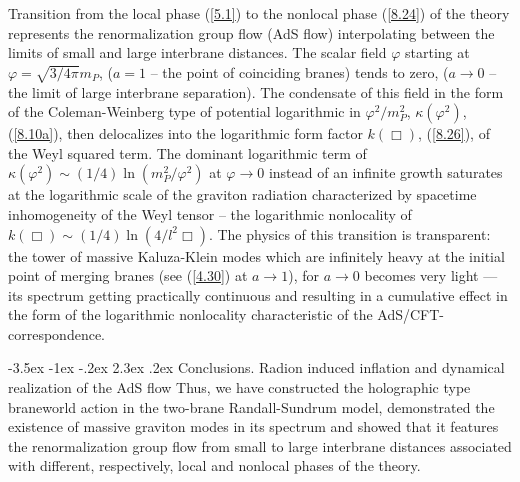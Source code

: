 \documentclass[a4paper,12pt]{article}
\makeatletter
\renewcommand\section{\@startsection {section}{1}{\z@}%
                                   {-3.5ex \@plus -1ex \@minus -.2ex}%
                                   {2.3ex \@plus.2ex}%
                                   {\normalfont\large\bfseries}}
\makeatother
\begin{document}
Transition from the local phase (\ref{5.1}) to the nonlocal phase
(\ref{8.24}) of the theory represents the renormalization group flow
(AdS flow) interpolating between the limits of small and large
interbrane distances. The scalar field $\varphi$ starting at
$\varphi=\sqrt{3/4\pi}m_P$, ($a=1$ -- the point of coinciding branes)
tends to zero, ($a\to 0$ -- the limit of large interbrane separation).
The condensate of this field in the form of the
Coleman-Weinberg type of potential logarithmic in $\varphi^2/m_P^2$,
$\kappa(\varphi^2)$, (\ref{8.10a}), then delocalizes into the logarithmic
form factor $k(\Box)$, (\ref{8.26}), of the Weyl squared term. The
dominant logarithmic term of $\kappa(\varphi^2)
\sim (1/4)\ln(m_P^2/\varphi^2)$ at $\varphi\to 0$ instead of an
infinite growth saturates
at the logarithmic scale of the graviton radiation characterized by
spacetime inhomogeneity of the Weyl tensor -- the logarithmic
nonlocality of $k(\Box)\sim(1/4)\ln(4/l^2\Box)$. The physics of
this transition is transparent: the tower of massive
Kaluza-Klein modes which are infinitely heavy at the initial point
of merging branes (see (\ref{4.30}) at $a\to 1$), for
$a\to 0$ becomes very light --- its spectrum getting practically
continuous and resulting in a cumulative effect in the form of the
logarithmic nonlocality characteristic of the AdS/CFT-correspondence.



\section{Conclusions. Radion induced inflation and dynamical
realization of the AdS flow}
Thus, we have constructed the holographic type braneworld action
in the two-brane Randall-Sundrum model, demonstrated the existence
of massive graviton modes in its spectrum and showed that it features
the renormalization group flow from small to large interbrane
distances associated with different, respectively, local and nonlocal
phases of the theory.
\end{document}
